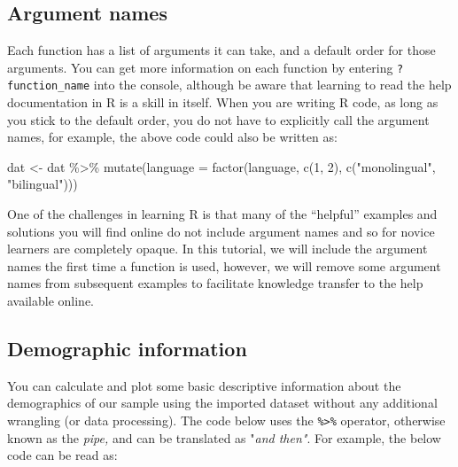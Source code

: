 \documentclass[
  english,
  doc,floatsintext]{apa6}
\newenvironment{Shaded}{\begin{snugshade}}{\end{snugshade}}
\newcommand{\AttributeTok}[1]{\textcolor[rgb]{0.77,0.63,0.00}{#1}}
\newcommand{\DecValTok}[1]{\textcolor[rgb]{0.00,0.00,0.81}{#1}}
\newcommand{\FunctionTok}[1]{\textcolor[rgb]{0.00,0.00,0.00}{#1}}
\newcommand{\NormalTok}[1]{#1}
\newcommand{\OtherTok}[1]{\textcolor[rgb]{0.56,0.35,0.01}{#1}}
\newcommand{\SpecialCharTok}[1]{\textcolor[rgb]{0.00,0.00,0.00}{#1}}
\newcommand{\StringTok}[1]{\textcolor[rgb]{0.31,0.60,0.02}{#1}}
\begin{document}
\hypertarget{argument-names}{%
\subsection{Argument names}\label{argument-names}}

Each function has a list of arguments it can take, and a default order for those arguments. You can get more information on each function by entering \texttt{?function\_name} into the console, although be aware that learning to read the help documentation in R is a skill in itself. When you are writing R code, as long as you stick to the default order, you do not have to explicitly call the argument names, for example, the above code could also be written as:

\begin{Shaded}
\begin{Highlighting}[]
\NormalTok{dat }\OtherTok{\textless{}{-}}\NormalTok{ dat }\SpecialCharTok{\%\textgreater{}\%}
  \FunctionTok{mutate}\NormalTok{(}\AttributeTok{language =} \FunctionTok{factor}\NormalTok{(language, }
                           \FunctionTok{c}\NormalTok{(}\DecValTok{1}\NormalTok{, }\DecValTok{2}\NormalTok{), }
                           \FunctionTok{c}\NormalTok{(}\StringTok{"monolingual"}\NormalTok{, }\StringTok{"bilingual"}\NormalTok{)))}
\end{Highlighting}
\end{Shaded}

One of the challenges in learning R is that many of the ``helpful'' examples and solutions you will find online do not include argument names and so for novice learners are completely opaque. In this tutorial, we will include the argument names the first time a function is used, however, we will remove some argument names from subsequent examples to facilitate knowledge transfer to the help available online.

\hypertarget{demographic-information}{%
\subsection{Demographic information}\label{demographic-information}}

You can calculate and plot some basic descriptive information about the demographics of our sample using the imported dataset without any additional wrangling (or data processing). The code below uses the \texttt{\%\textgreater{}\%} operator, otherwise known as the \emph{pipe,} and can be translated as "\emph{and then"}. For example, the below code can be read as:
\end{document}
